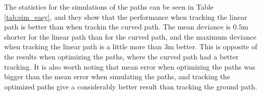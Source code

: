 The statistics for the simulations of the paths can be seen in Table \ref{tab:sim_easy}, and they show that the performance when tracking the linear path is better than when trackin the curved path. The mean deviance is $0.5$m shorter for the linear path than for the curved path, and the maximum deviance when tracking the linear path is a little more than $3$m better. This is opposite of the results when optimizing the paths, where the curved path had a better tracking. It is also worth noting that mean error when optimizing the paths was bigger than the mean error when simulating the paths, and tracking the optimized paths give a considerably better result than tracking the ground path.